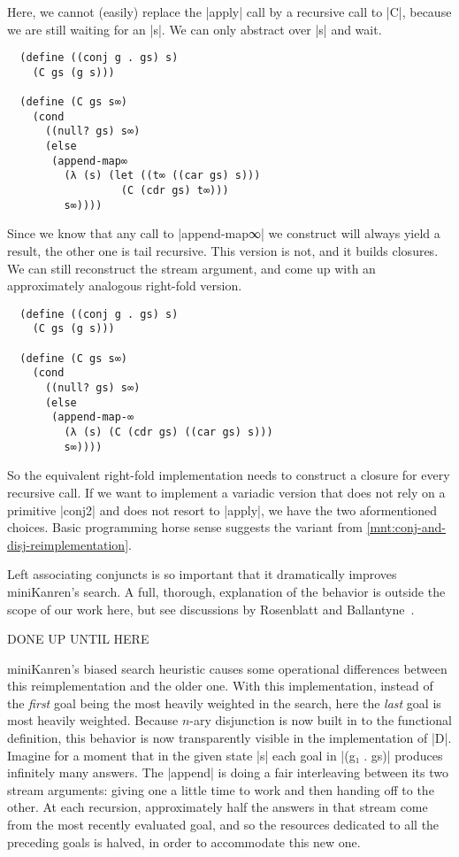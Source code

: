 \documentclass[sigplan,screen,draft,anonymous,review,natbib=false]{acmart}
\begin{document}
Here, we cannot (easily) replace the \rackinline|apply| call by a
recursive call to \rackinline|C|, because we are still waiting for an
\rackinline|s|. We can only abstract over \rackinline|s| and wait.

\begin{verbatim}
  (define ((conj g . gs) s)
    (C gs (g s)))

  (define (C gs s∞)
    (cond
      ((null? gs) s∞)
      (else
       (append-map∞
         (λ (s) (let ((t∞ ((car gs) s)))
                  (C (cdr gs) t∞)))
         s∞))))
\end{verbatim}

\noindent Since we know that any call to \rackinline|append-map∞| we
construct will always yield a result, the other one is tail recursive.
This version is not, and it builds closures. We can still reconstruct
the stream argument, and come up with an approximately analogous
right-fold version.

\begin{verbatim}
  (define ((conj g . gs) s)
    (C gs (g s)))

  (define (C gs s∞)
    (cond
      ((null? gs) s∞)
      (else
       (append-map-∞
         (λ (s) (C (cdr gs) ((car gs) s)))
         s∞))))
\end{verbatim}

So the equivalent right-fold implementation needs to construct a
closure for every recursive call. If we want to implement a variadic
version that does not rely on a primitive \rackinline|conj2| and does
not resort to \rackinline|apply|, we have the two aformentioned
choices. Basic programming horse sense suggests the variant from
\cref{mnt:conj-and-disj-reimplementation}.

Left associating conjuncts is so important that it dramatically
improves miniKanren's search. A full, thorough, explanation of the
behavior is outside the scope of our work here, but see discussions by
Rosenblatt and Ballantyne~\cite{here,nowhere}.

DONE UP UNTIL HERE

miniKanren's biased search heuristic causes some operational
differences between this reimplementation and the older one. With this
implementation, instead of the \emph{first} goal being the most
heavily weighted in the search, here the \emph{last} goal is most
heavily weighted. Because $n$-ary disjunction is now built in to the
functional definition, this behavior is now transparently visible in
the implementation of \rackinline|D|. Imagine for a moment that in
the given state \rackinline|s| each goal in \rackinline|(g₁ . gs)|
produces infinitely many answers. The \rackinline|append| is doing a
fair interleaving between its two stream arguments: giving one a
little time to work and then handing off to the other. At each
recursion, approximately half the answers in that stream come from the
most recently evaluated goal, and so the resources dedicated to all
the preceding goals is halved, in order to accommodate this new one.
\end{document}
